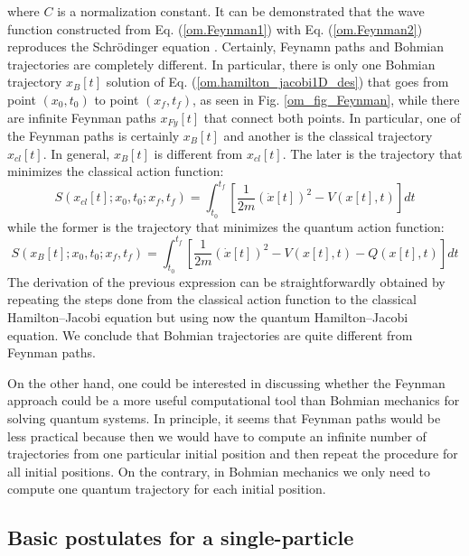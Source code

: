 \documentclass[onecolumn,nofootinbib, secnumarabic, amsmath, nobibnotes,11pt,aps,pra]{revtex4-1}
\newcommand{\fref}[1]{Fig. \ref{#1}}
\newcommand{\eref}[1]{Eq. (\ref{#1})}
\begin{document}
\noindent where $C$ is a normalization constant. It can be
demonstrated that the wave function constructed from
\eref{om.Feynman1} with \eref{om.Feynman2} reproduces the
Schr\"odinger equation \cite{om.feynmann1965}. Certainly, Feynamn
paths and Bohmian trajectories are completely different. In
particular, there is only one Bohmian trajectory $x\!_{B}[t]$ solution
of \eref{om.hamilton_jacobi1D_des} that goes from point $(x_0,t_0)$
to point $(x\!_f,t\!_f)$, as seen in \fref{om_fig_Feynman}, while there
are infinite Feynman paths $x_\textit{Fy}[t]$ that connect both points. In
particular, one of the Feynman paths is certainly $x\!_{B}[t]$ and
another is the classical trajectory $x_{cl}[t]$. In general,
$x\!_{B}[t]$ is different from $x_{cl}[t]$. The later is the
trajectory that minimizes the classical action function:
\begin{equation}
\label{om.action_function_clas}
 S(x_{cl}[t];x_0,t_0;x_f,t_f) = \int_{t_0}^{t_f} \left[ \frac {1} {2m} (\dot{x}[t])^2 -V(x[t],t) \right] dt
\end{equation}
while the former is the trajectory that minimizes the quantum action function:
\begin{equation}
\label{om.action_function_quan}
 S(x_{B}[t];x_0,t_0;x_f,t_f) =\! \int_{t_0}^{t_f} \left[ \frac {1} {2m} (\dot{x}[t])^2 -V(x[t],t) -Q(x[t],t) \right] dt
\end{equation}
The derivation of the previous expression can be straightforwardly obtained by repeating the steps done from the classical action function to the classical Hamilton--Jacobi equation but using now the quantum Hamilton--Jacobi equation. We conclude that Bohmian trajectories are quite different from Feynman paths.


On the other hand, one could be interested in discussing whether the Feynman approach could be a more useful computational tool than Bohmian mechanics for solving quantum systems. In principle, it seems that Feynman paths would be less practical because then we would have to compute an infinite number of trajectories from one particular initial position and then repeat the procedure for all initial positions. On the contrary, in Bohmian mechanics we only need to compute one quantum trajectory for each initial position.


\subsection{Basic postulates  for a single-particle}\label{om.sec_single.6}
\end{document}
